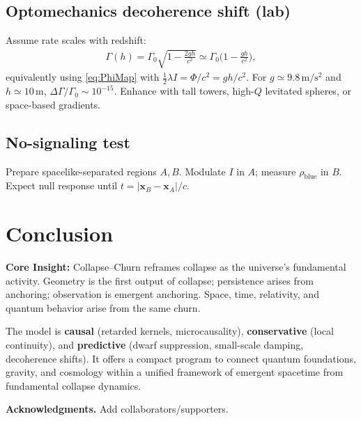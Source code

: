 \documentclass[11pt]{article}
\begin{document}
\subsection{Optomechanics decoherence shift (lab)}
Assume rate scales with redshift:
\begin{align}
\Gamma(h)=\Gamma_0\sqrt{1-\tfrac{2gh}{c^2}}\simeq \Gamma_0\Big(1-\frac{gh}{c^2}\Big),
\end{align}
equivalently using \eqref{eq:PhiMap} with $\tfrac12\lambda I=\Phi/c^2=gh/c^2$. For $g\simeq 9.8\,\mathrm{m/s^2}$ and $h\simeq 10\,\mathrm{m}$, $\Delta\Gamma/\Gamma_0\sim 10^{-15}$. Enhance with tall towers, high-$Q$ levitated spheres, or space-based gradients.

\subsection{No-signaling test}
Prepare spacelike-separated regions $A,B$. Modulate $I$ in $A$; measure $\rho_{\mathrm{blue}}$ in $B$. Expect null response until $t=|\mathbf x_B-\mathbf x_A|/c$.


\section{Conclusion}

\begin{keyresult}
\textbf{Core Insight:} Collapse--Churn reframes collapse as the universe's fundamental activity. Geometry is the first output of collapse; persistence arises from anchoring; observation is emergent anchoring. Space, time, relativity, and quantum behavior arise from the same churn.
\end{keyresult}

\vspace{0.5em}

The model is \textcolor{primaryblue}{\textbf{causal}} (retarded kernels, microcausality), \textcolor{primaryblue}{\textbf{conservative}} (local continuity), and \textcolor{primaryblue}{\textbf{predictive}} (dwarf suppression, small-scale damping, decoherence shifts). It offers a compact program to connect quantum foundations, gravity, and cosmology within a unified framework of emergent spacetime from fundamental collapse dynamics.

\vspace{2em}
\noindent\textbf{Acknowledgments.} Add collaborators/supporters.



\end{document}
